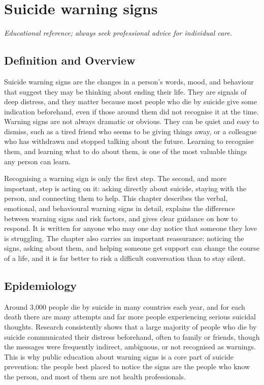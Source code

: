 \chapter{Suicide warning signs}

\medskip
\noindent\textit{Educational reference; always seek professional advice for individual care.}

\section*{Definition and Overview}
Suicide warning signs are the changes in a person's words, mood, and behaviour that suggest they may be thinking about ending their life. They are signals of deep distress, and they matter because most people who die by suicide give some indication beforehand, even if those around them did not recognise it at the time. Warning signs are not always dramatic or obvious. They can be quiet and easy to dismiss, such as a tired friend who seems to be giving things away, or a colleague who has withdrawn and stopped talking about the future. Learning to recognise them, and learning what to do about them, is one of the most valuable things any person can learn.

Recognising a warning sign is only the first step. The second, and more important, step is acting on it: asking directly about suicide, staying with the person, and connecting them to help. This chapter describes the verbal, emotional, and behavioural warning signs in detail, explains the difference between warning signs and risk factors, and gives clear guidance on how to respond. It is written for anyone who may one day notice that someone they love is struggling. The chapter also carries an important reassurance: noticing the signs, asking about them, and helping someone get support can change the course of a life, and it is far better to risk a difficult conversation than to stay silent.

\section*{Epidemiology}
Around 3,000 people die by suicide in many countries each year, and for each death there are many attempts and far more people experiencing serious suicidal thoughts. Research consistently shows that a large majority of people who die by suicide communicated their distress beforehand, often to family or friends, though the messages were frequently indirect, ambiguous, or not recognised as warnings. This is why public education about warning signs is a core part of suicide prevention: the people best placed to notice the signs are the people who know the person, and most of them are not health professionals.

